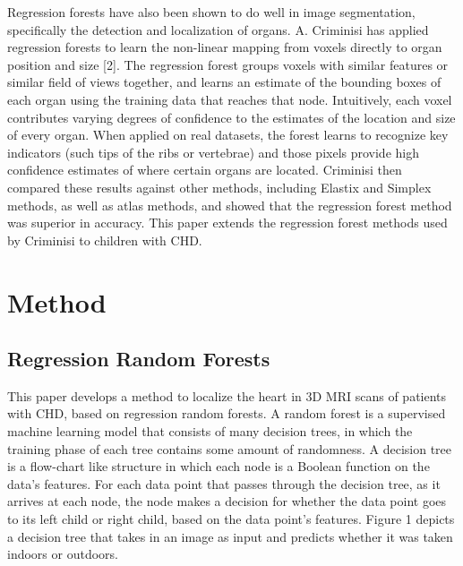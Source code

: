 Regression forests have also been shown to do well in image segmentation, specifically the detection and localization of organs. A. Criminisi has applied regression forests to learn the non-linear mapping from voxels directly to organ position and size [2]. The regression forest groups voxels with similar features or similar field of views together, and learns an estimate of the bounding boxes of each organ using the training data that reaches that node. Intuitively, each voxel contributes varying degrees of confidence to the estimates of the location and size of every organ. When applied on real datasets, the forest learns to recognize key indicators (such tips of the ribs or vertebrae) and those pixels provide high confidence estimates of where certain organs are located. Criminisi then compared these results against other methods, including Elastix and Simplex methods, as well as atlas methods, and showed that the regression forest method was superior in accuracy. This paper extends the regression forest methods used by Criminisi to children with CHD.

\section{Method}
\subsection{Regression Random Forests}
This paper develops a method to localize the heart in 3D MRI scans of patients with CHD, based on regression random forests. A random forest is a supervised machine learning model that consists of many decision trees, in which the training phase of each tree contains some amount of randomness. A decision tree is a flow-chart like structure in which each node is a Boolean function on the data's features. For each data point that passes through the decision tree, as it arrives at each node, the node makes a decision for whether the data point goes to its left child or right child, based on the data point's features. Figure 1 depicts a decision tree that takes in an image as input and predicts whether it was taken indoors or outdoors.

